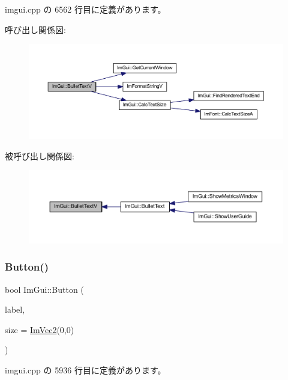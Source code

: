  imgui.\+cpp の 6562 行目に定義があります。

呼び出し関係図\+:\nopagebreak
\begin{figure}[H]
\begin{center}
\leavevmode
\includegraphics[width=350pt]{namespace_im_gui_af8f4b5e96c745e205974857f9a584583_cgraph}
\end{center}
\end{figure}
被呼び出し関係図\+:\nopagebreak
\begin{figure}[H]
\begin{center}
\leavevmode
\includegraphics[width=350pt]{namespace_im_gui_af8f4b5e96c745e205974857f9a584583_icgraph}
\end{center}
\end{figure}
\mbox{\label{namespace_im_gui_a38094c568ce398db5a3abb9d3ac92030}} 
\subsubsection{\texorpdfstring{Button()}{Button()}}
{\footnotesize\ttfamily bool Im\+Gui\+::\+Button (\begin{DoxyParamCaption}\item[{const char $\ast$}]{label,  }\item[{const \mbox{\hyperlink{struct_im_vec2}{Im\+Vec2}} \&}]{size = {\ttfamily \mbox{\hyperlink{struct_im_vec2}{Im\+Vec2}}(0,0)} }\end{DoxyParamCaption})}



 imgui.\+cpp の 5936 行目に定義があります。

